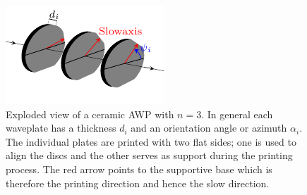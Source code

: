 \begin{figure}[ht]
    \centering
    \includegraphics[scale=3.00]{images/results/tikz_wpstack_ceramic.pdf}
    \caption{Exploded view of a ceramic AWP with $n=3$. In general each waveplate has a thickness $d_i$ and an orientation angle or azimuth $\alpha_i$. The individual plates are printed with two flat sides; one is used to align the discs and the other serves as support during the printing process. The red arrow points to the supportive base which is therefore the printing direction and hence the slow direction.}
    \label{fig:ceramic_stack}
\end{figure}


